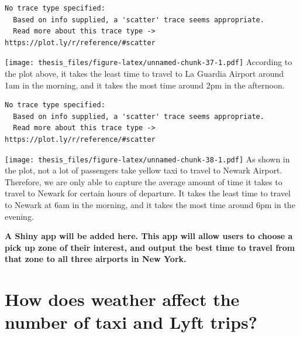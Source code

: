\documentclass[12pt,twoside]{reedthesis}
\newenvironment{Shaded}{\begin{snugshade}}{\end{snugshade}}
\newcommand{\KeywordTok}[1]{\textcolor[rgb]{0.13,0.29,0.53}{\textbf{#1}}}
\newcommand{\DataTypeTok}[1]{\textcolor[rgb]{0.13,0.29,0.53}{#1}}
\newcommand{\StringTok}[1]{\textcolor[rgb]{0.31,0.60,0.02}{#1}}
\newcommand{\OperatorTok}[1]{\textcolor[rgb]{0.81,0.36,0.00}{\textbf{#1}}}
\newcommand{\NormalTok}[1]{#1}
\theoremstyle{definition}
\theoremstyle{definition}
\theoremstyle{definition}
\theoremstyle{remark}
\begin{document}
\begin{verbatim}
No trace type specified:
  Based on info supplied, a 'scatter' trace seems appropriate.
  Read more about this trace type -> https://plot.ly/r/reference/#scatter
\end{verbatim}
\texttt{[image: thesis\_files/figure-latex/unnamed-chunk-37-1.pdf]}
According to the plot above, it takes the least time to travel to La
Guardia Airport around 1am in the morning, and it takes the most time
around 2pm in the afternoon.
\begin{Shaded}
\end{Shaded}
\begin{verbatim}
No trace type specified:
  Based on info supplied, a 'scatter' trace seems appropriate.
  Read more about this trace type -> https://plot.ly/r/reference/#scatter
\end{verbatim}
\texttt{[image: thesis\_files/figure-latex/unnamed-chunk-38-1.pdf]} As
shown in the plot, not a lot of passengers take yellow taxi to travel to
Newark Airport. Therefore, we are only able to capture the average
amount of time it takes to travel to Newark for certain hours of
departure. It takes the least time to travel to Newark at 6am in the
morning, and it takes the most time around 6pm in the evening.

\textbf{A Shiny app will be added here. This app will allow users to
choose a pick up zone of their interest, and output the best time to
travel from that zone to all three airports in New York.}

\section{How does weather affect the number of taxi and Lyft
trips?}\label{how-does-weather-affect-the-number-of-taxi-and-lyft-trips}
\end{document}
